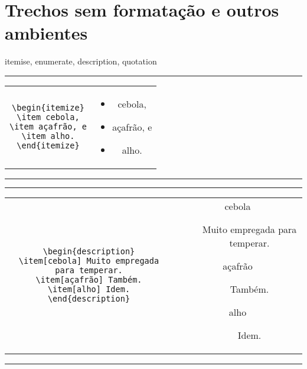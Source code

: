 \section{Trechos sem formatação e outros ambientes}


itemise, enumerate, description, quotation

\begin{center}\footnotesize\hrule\smallskip
\begin{tabular}{c|c}
\begin{minipage}{.5\textwidth}
\begin{verbatim}
\begin{itemize}
\item cebola,
\item açafrão, e
\item alho.
\end{itemize}
\end{verbatim}
\end{minipage} &
\begin{minipage}{.5\textwidth}
\begin{itemize}
\item cebola,
\item açafrão, e
\item alho.
\end{itemize}
\end{minipage}
\end{tabular}
\smallskip\hrule
\end{center}


\begin{center}\footnotesize\hrule\smallskip
\begin{tabular}{c|c}
\begin{minipage}{.5\textwidth}
\begin{verbatim}
\begin{description}
\item[cebola] Muito empregada para temperar.
\item[açafrão] Também.
\item[alho] Idem.
\end{description}
\end{verbatim}
\end{minipage} &
\begin{minipage}{.5\textwidth}
\begin{description}
\item[cebola] Muito empregada para temperar.
\item[açafrão] Também.
\item[alho] Idem.
\end{description}
\end{minipage}
\end{tabular}
\smallskip\hrule
\end{center}
